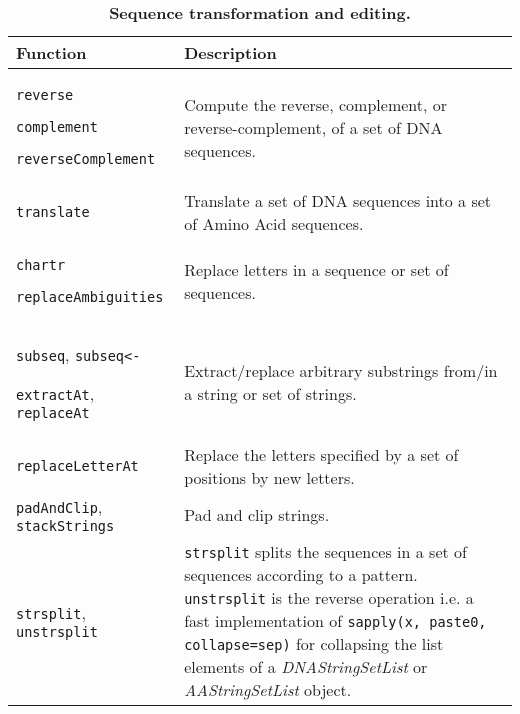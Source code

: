 \documentclass[10pt]{article}
\newcommand{\code}[1]{{\texttt{#1}}}
\newcommand{\Rfunction}[1]{\texttt{#1}}
\newcommand{\Rclass}[1]{{\textit{#1}}}
\begin{document}

\begin{table}[ht]
\begin{center}
\begin{tabular}{p{2.5in}|p{4in}}
{\bf Function} & {\bf Description} \\
\hline
\Rfunction{reverse}\par
\Rfunction{complement}\par
\Rfunction{reverseComplement} &
    Compute the reverse, complement, or reverse-complement, of a set of
    DNA sequences. \\
\hline
\Rfunction{translate} &
    Translate a set of DNA sequences into a set of Amino Acid sequences. \\
\hline
\Rfunction{chartr}\par
\Rfunction{replaceAmbiguities} &
    Replace letters in a sequence or set of sequences. \\
\hline
\Rfunction{subseq}, \Rfunction{subseq<-}\par
\Rfunction{extractAt}, \Rfunction{replaceAt} &
    Extract/replace arbitrary substrings from/in a string or set of strings. \\
\hline
\Rfunction{replaceLetterAt} & Replace the letters specified by a set of
    positions by new letters. \\
\hline
\Rfunction{padAndClip}, \Rfunction{stackStrings} & Pad and clip strings. \\
\hline
\Rfunction{strsplit}, \Rfunction{unstrsplit} & \Rfunction{strsplit} splits the
    sequences in a set of sequences according to a pattern.
    \Rfunction{unstrsplit} is the reverse operation i.e. a fast implementation
    of \code{sapply(x, paste0, collapse=sep)} for collapsing the list elements
    of a \Rclass{DNAStringSetList} or \Rclass{AAStringSetList} object. \\
\hline
\end{tabular}
\end{center}
\caption{\bf Sequence transformation and editing.}
\label{table:Sequence_editing}
\end{table}

\end{document}
